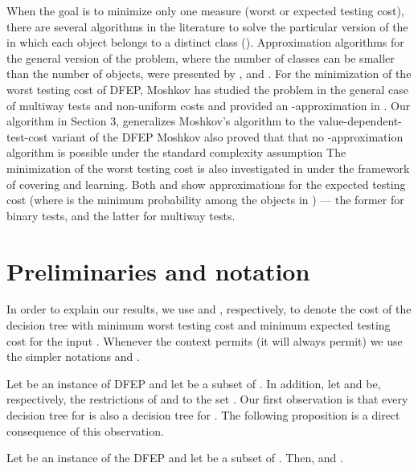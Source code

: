 \documentclass{llncs}
\begin{document}
When the goal is to minimize only one 
measure (worst or expected testing cost), there are several 
algorithms in the literature to solve the particular version of the  in which 
each object belongs to a distinct class 
(\cite{garey_id,Kos_id,pandit_id,adler_id,guillory_id,laber_id,guillory2,gupta}).
 Approximation algorithms for the general version of the problem, where the number of classes  can be smaller than the number of objects, were presented by
   \cite{bellala}, \cite{golovin} and \cite{labericml}. 
For the minimization of the worst testing cost of DFEP, Moshkov  has studied the problem 
in the general case of multiway tests and non-uniform costs and provided 
an -approximation in \cite{Moshkov2}. 
Our algorithm in Section 3, generalizes Moshkov's algorithm to the value-dependent-test-cost variant of the DFEP
Moshkov \cite{Moshkov2} also proved  that
that 
no -approximation algorithm is possible under the standard  complexity assumption
 The minimization of the worst testing cost is also investigated in 
\cite{conf/icml/GuilloryB11}  under the framework of covering and learning.
	Both \cite{bellala} and \cite{golovin} show 
  approximations for the expected testing cost (where  is the minimum probability among the 
 objects in ) \---- the former for binary tests, and the latter for multiway 
 tests.  












\section{Preliminaries and notation}
\label{sec:prelim}

In order to explain our results, we use  and , respectively, to denote the cost
of the decision tree with minimum worst testing cost
and  minimum expected testing cost for the input .
Whenever the context permits (it will always permit) we  use the simpler notations
 and .


Let  be an instance
of DFEP and let   be a subset of .
In addition, let  and  be, respectively, the restrictions of  and 
to the set .
Our first observation is that every decision tree
 for   is also a decision tree
for .
The following proposition is a direct consequence of this  observation.

\begin{proposition}
\label{prop:Subadditivity}
Let  be an instance
of the DFEP and let   be a subset of .
Then,  and
.
\end{proposition}
\end{document}
